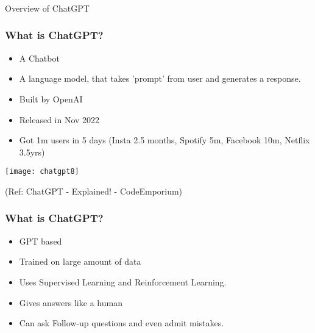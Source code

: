 \begin{frame}[fragile]\frametitle{}
\begin{center}
{\Large Overview of ChatGPT}
\end{center}
\end{frame}




\begin{frame}[fragile]\frametitle{What is ChatGPT?}


\begin{itemize}
\item A Chatbot
\item A language model, that takes 'prompt' from user and generates a response.
\item Built by OpenAI
\item Released in Nov 2022
\item Got 1m users in 5 days  (Insta 2.5 months, Spotify 5m, Facebook 10m, Netflix 3.5yrs)
\end{itemize}	 

\begin{center}
\texttt{[image: chatgpt8]}
\end{center}				
{\tiny (Ref: ChatGPT - Explained! - CodeEmporium)}
			
			
\end{frame}

\begin{frame}[fragile]\frametitle{What is ChatGPT?}


\begin{itemize}
\item GPT based
\item Trained on large amount of data
\item Uses Supervised Learning and Reinforcement Learning.
\item Gives answers like a human
\item Can ask Follow-up questions and even admit mistakes.
\end{itemize}	 

\end{frame}


